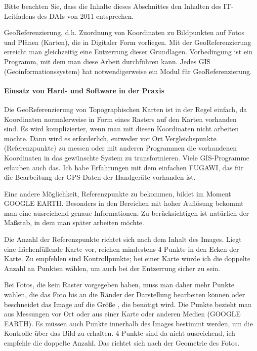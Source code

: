%
%
Bitte beachten Sie, dass die Inhalte dieses Abschnittes den Inhalten des IT-Leitfadens des DAIs von 2011 entsprechen.
\begin{center}
\tib{\rule{0.9\textwidth}{0.2mm}}\vspace{3mm}
\end{center}

GeoReferenzierung, d.h. Zuordnung von Koordinaten zu Bildpunkten auf Fotos und Plänen (Karten), die in Digitaler Form vorliegen.
Mit der GeoReferenzierung erreicht man gleichzeitig eine Entzerrung dieser Grundlagen. Vorbedingung ist ein Programm, mit dem man diese Arbeit durchführen kann. Jedes GIS (Geoinformationssystem) hat notwendigerweise ein Modul für GeoReferenzierung.

\paragraph{Einsatz von Hard- und Software in der Praxis}
Die GeoReferenzierung von Topographischen Karten ist in der Regel einfach, da Koordinaten normalerweise in Form eines Rasters auf den Karten vorhanden sind. Es wird komplizierter, wenn man mit diesen Koordinaten nicht arbeiten möchte. Dann wird es erforderlich, entweder vor Ort Vergleichspunkte (Referenzpunkte) zu messen oder mit anderen Programmen die vorhandenen Koordinaten in das gewünschte System zu transformieren. Viele GIS-Programme erlauben auch das. Ich habe Erfahrungen mit dem einfachen FUGAWI, das für die Bearbeitung der GPS-Daten der Handgeräte vorhanden ist.

Eine andere Möglichkeit, Referenzpunkte zu bekommen, bildet im Moment GOOGLE EARTH.  Besonders in den Bereichen mit hoher Auflösung bekommt man eine ausreichend genaue Informationen. Zu berücksichtigen ist natürlich der Maßstab, in dem man später arbeiten möchte. 

Die Anzahl der Referenzpunkte richtet sich nach dem Inhalt des Images. Liegt eine flächenfüllende Karte vor, reichen mindestens 4 Punkte in den Ecken der Karte. Zu empfehlen sind Kontrollpunkte; bei einer Karte würde ich die doppelte Anzahl an Punkten wählen, um auch bei der Entzerrung sicher zu sein.

Bei Fotos, die kein Raster vorgegeben haben, muss man daher mehr Punkte wählen, die das Foto bis an die Ränder der Darstellung bearbeiten können oder beschneidet das Image auf die Größe , die benötigt wird. Die Punkte bezieht man aus Messungen vor Ort oder aus einer Karte oder anderen Medien (GOOGLE EARTH). Es müssen auch Punkte innerhalb des Images bestimmt werden, um die Kontrolle über das Bild zu erhalten. 4 Punkte sind da nicht ausreichend, ich empfehle die doppelte Anzahl. Das richtet sich nach der Geometrie des Fotos.

